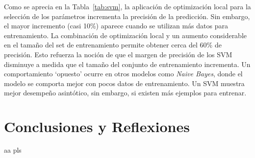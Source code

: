 \documentclass{llncs}
\begin{document}
Como se aprecia en la Tabla~\ref{tab:svm}, la aplicación de optimización local para la selección de los parámetros incrementa la precisión de la predicción.
Sin embargo, el mayor incremento (casi 10\%) aparece cuando se utilizan más datos para entrenamiento.
La combinación de optimización local y un aumento considerable en el tamaño del set de entrenamiento permite obtener cerca del 60\% de precisión.
Esto refuerza la noción de que el margen de precisión de los SVM disminuye a medida que el tamaño del conjunto de entrenamiento incrementa.
Un comportamiento `opuesto' ocurre en otros modelos como \textit{Naive Bayes},
donde el modelo se comporta mejor con pocos datos de entrenamiento.
Un SVM muestra mejor desempeño asintótico, sin embargo, si existen más ejemplos para entrenar.

\section{Conclusiones y Reflexiones}
\label{sec:conc}

aa pls



\end{document}
